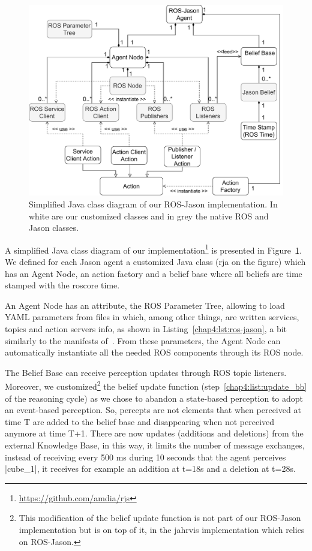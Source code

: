 \documentclass[a4paper,11pt,twoside]{StyleThese}
\begin{document}
\begin{figure}[!ht]
	\includegraphics[width=\linewidth]{figures/chapter2/RJS_diagram.pdf}
	\caption{Simplified Java class diagram of our ROS-Jason implementation. In white are our customized classes and in grey the native ROS and Jason classes.}
	\label{chap4:fig:rjs}
\end{figure}

A simplified Java class diagram of our  implementation\footnote{\url{https://github.com/amdia/rjs}} is presented in Figure~\ref{chap4:fig:rjs}. We defined for each Jason agent a customized Java class (\acrfull{rja} on the figure) which has an Agent Node, an action factory and a belief base where all beliefs are time stamped with the roscore time. 

An Agent Node has an attribute, the ROS Parameter Tree, allowing to load YAML parameters from files in which, among other things, are written services, topics and action servers info, as shown in Listing~\ref{chap4:lst:ros-jason}, a bit similarly to the manifests of~\cite{silva_2020_embedded}. From these parameters, the Agent Node can automatically instantiate all the needed ROS components through its ROS node. 

The Belief Base can receive perception updates through ROS topic listeners. Moreover, we customized\footnote{This modification of the belief update function is not part of our ROS-Jason implementation but is on top of it, in the \acrshort{jahrvis} implementation which relies on ROS-Jason.} the belief update function (step~\ref{chap4:list:update_bb} of the reasoning cycle) as we chose to abandon a state-based perception to adopt an event-based perception. So, percepts are not elements that when perceived at time T are added to the belief base and disappearing when not perceived anymore at time T+1. There are now updates (additions and deletions) from the external Knowledge Base, in this way, it limits the number of message exchanges, \ie instead of receiving every 500 ms during 10 seconds that the agent perceives |cube_1|, it receives for example an addition at t=18s and a deletion at t=28s. 
\end{document}
